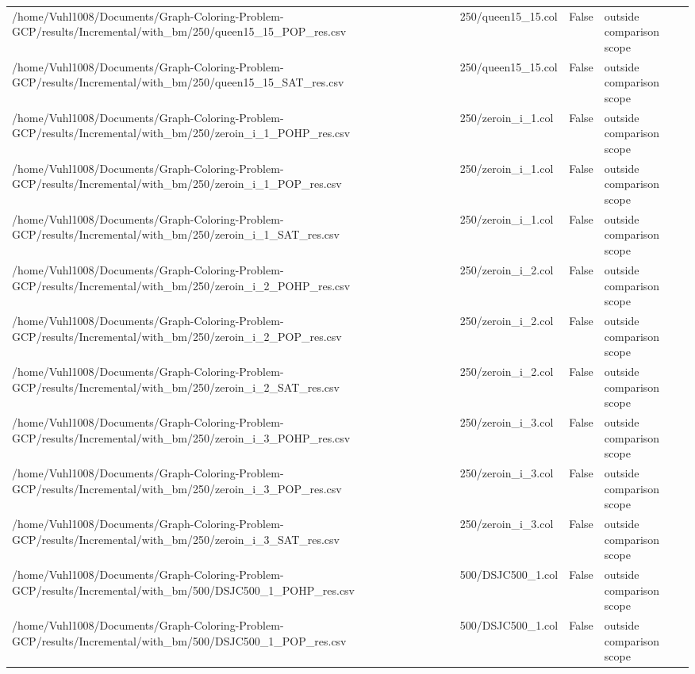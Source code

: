 \begin{table}[htbp]
\begin{tabular}{llll}
/home/Vuhl1008/Documents/Graph-Coloring-Problem-GCP/results/Incremental/with\_bm/250/queen15\_15\_POP\_res.csv & 250/queen15\_15.col & False & outside comparison scope \\
/home/Vuhl1008/Documents/Graph-Coloring-Problem-GCP/results/Incremental/with\_bm/250/queen15\_15\_SAT\_res.csv & 250/queen15\_15.col & False & outside comparison scope \\
/home/Vuhl1008/Documents/Graph-Coloring-Problem-GCP/results/Incremental/with\_bm/250/zeroin\_i\_1\_POHP\_res.csv & 250/zeroin\_i\_1.col & False & outside comparison scope \\
/home/Vuhl1008/Documents/Graph-Coloring-Problem-GCP/results/Incremental/with\_bm/250/zeroin\_i\_1\_POP\_res.csv & 250/zeroin\_i\_1.col & False & outside comparison scope \\
/home/Vuhl1008/Documents/Graph-Coloring-Problem-GCP/results/Incremental/with\_bm/250/zeroin\_i\_1\_SAT\_res.csv & 250/zeroin\_i\_1.col & False & outside comparison scope \\
/home/Vuhl1008/Documents/Graph-Coloring-Problem-GCP/results/Incremental/with\_bm/250/zeroin\_i\_2\_POHP\_res.csv & 250/zeroin\_i\_2.col & False & outside comparison scope \\
/home/Vuhl1008/Documents/Graph-Coloring-Problem-GCP/results/Incremental/with\_bm/250/zeroin\_i\_2\_POP\_res.csv & 250/zeroin\_i\_2.col & False & outside comparison scope \\
/home/Vuhl1008/Documents/Graph-Coloring-Problem-GCP/results/Incremental/with\_bm/250/zeroin\_i\_2\_SAT\_res.csv & 250/zeroin\_i\_2.col & False & outside comparison scope \\
/home/Vuhl1008/Documents/Graph-Coloring-Problem-GCP/results/Incremental/with\_bm/250/zeroin\_i\_3\_POHP\_res.csv & 250/zeroin\_i\_3.col & False & outside comparison scope \\
/home/Vuhl1008/Documents/Graph-Coloring-Problem-GCP/results/Incremental/with\_bm/250/zeroin\_i\_3\_POP\_res.csv & 250/zeroin\_i\_3.col & False & outside comparison scope \\
/home/Vuhl1008/Documents/Graph-Coloring-Problem-GCP/results/Incremental/with\_bm/250/zeroin\_i\_3\_SAT\_res.csv & 250/zeroin\_i\_3.col & False & outside comparison scope \\
/home/Vuhl1008/Documents/Graph-Coloring-Problem-GCP/results/Incremental/with\_bm/500/DSJC500\_1\_POHP\_res.csv & 500/DSJC500\_1.col & False & outside comparison scope \\
/home/Vuhl1008/Documents/Graph-Coloring-Problem-GCP/results/Incremental/with\_bm/500/DSJC500\_1\_POP\_res.csv & 500/DSJC500\_1.col & False & outside comparison scope \\

\end{tabular}
\end{table}
